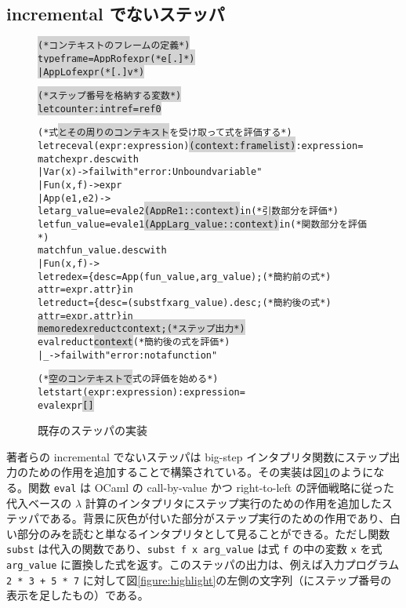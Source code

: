 \subsection{incremental でないステッパ}

\begin{figure}[t]
  \begin{alltt}
\colorbox{lightgray}{(* コンテキストのフレームの定義 *)}
\colorbox{lightgray}{type frame = AppR of expr  (* e [.] *)}
\colorbox{lightgray}{           | AppL of expr  (* [.] v *)}

\colorbox{lightgray}{(* ステップ番号を格納する変数 *)}
\colorbox{lightgray}{let counter : int ref = ref 0}

(* 式\colorbox{lightgray}{とその周りのコンテキスト}を受け取って式を評価する *)
let rec eval (expr : expression) \colorbox{lightgray}{(context : frame list)} : expression =
  match expr.desc with
  | Var (x) -> failwith "error: Unbound variable"
  | Fun (x, f) -> expr
  | App (e1, e2) ->
    let arg\_value = eval e2 \colorbox{lightgray}{(AppR e1 :: context)} in          (* 引数部分を評価 *)
    let fun\_value = eval e1 \colorbox{lightgray}{(AppL arg\_value :: context)} in   (* 関数部分を評価 *)
    match fun\_value.desc with
    | Fun (x, f) ->
    let redex = \{desc = App (fun\_value, arg\_value);               (* 簡約前の式 *)
                 attr = expr.attr\} in
      let reduct = \{desc = (subst f x arg\_value).desc ;          (* 簡約後の式 *)
                    attr = expr.attr\} in
      \colorbox{lightgray}{memo redex reduct context;                              (* ステップ出力 *)}
      eval reduct \colorbox{lightgray}{context}                                  (* 簡約後の式を評価 *)
    | \_ -> failwith "error: not a function"

(* \colorbox{lightgray}{空のコンテキストで}式の評価を始める *)
let start (expr : expression) : expression =
  eval expr \colorbox{lightgray}{[]}
\end{alltt}
\caption{既存のステッパの実装}
\label{figure:old-stepper}
\end{figure}

著者らの incremental でないステッパ\cite{FCA19}は big-step インタプリタ関数にステップ出力のための作用を追加することで構築されている。その実装は図\ref{figure:old-stepper}のようになる。関数 \texttt{eval} は OCaml の call-by-value かつ right-to-left の評価戦略に従った代入ベースの $\lambda$ 計算のインタプリタにステップ実行のための作用を追加したステッパである。背景に灰色が付いた部分がステップ実行のための作用であり、白い部分のみを読むと単なるインタプリタとして見ることができる。ただし関数 \texttt{subst} は代入の関数であり、\texttt{subst f x arg\_value} は式 \texttt{f} の中の変数 \texttt{x} を式 \texttt{arg\_value} に置換した式を返す。このステッパの出力は、例えば入力プログラム \texttt{2 * 3 + 5 * 7} に対して図\ref{figure:highlight}の左側の文字列（にステップ番号の表示を足したもの）である。

